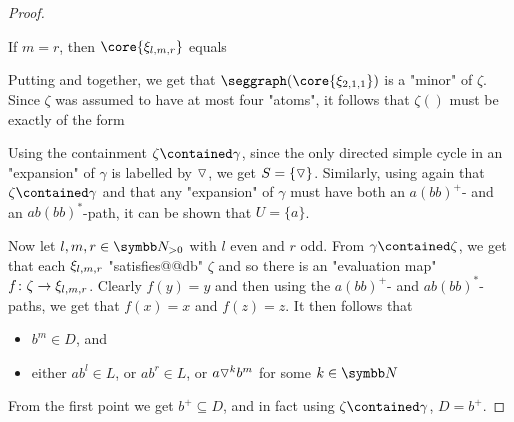 \begin{proof}
	\begin{claim}
		\AP\label{claim:example-union-matter-2}
		If $m=r$, then $\core{\anexpansion_{l,m,r}}$ equals
		\begin{center}
			\small
		\end{center}
	\end{claim}
	Putting  and
	 together, we get that 
	$\seggraph(\core{\anexpansion_{2,1,1}})$ is a "minor" of $\zeta$.
	Since $\zeta$ was assumed to have at most four "atoms",
	it follows that $\zeta()$ must be exactly of the form
	\begin{center}
	\end{center}
	Using the containment $\zeta \contained \gamma$,
	since the only directed simple cycle in an "expansion" of $\gamma$ is labelled
	by $\triangledown$, we get $S = \{\triangledown\}$.
	Similarly, using again that $\zeta \contained \gamma$ and that any "expansion" of $\gamma$
	must have both an $a(bb)^+$- and an $ab(bb)^*$-path, it can be shown that $U = \{a\}$.

	Now let $l,m,r \in \Np$ with $l$ even and $r$ odd.
	From $\gamma \contained \zeta$, we get that each $\xi_{l,m,r}$ "satisfies@@db"
	$\zeta$ and so there is an "evaluation map" $f\colon \zeta \to \xi_{l,m,r}$.
	Clearly $f(y) = y$ and then using the
	$a(bb)^+$- and $ab(bb)^*$-paths, we get that $f(x) = x$ and $f(z) = z$. 
	It then follows that
	\begin{itemize}
		\item $b^m \in D$, and
		\item either $ab^l \in L$, or $ab^r \in L$, or $a \triangledown^k b^m$ for some $k\in\N$
	\end{itemize}
	From the first point we get $b^+ \subseteq D$, and in fact using $\zeta\contained \gamma$,
	$D = b^+$.


\end{proof}
